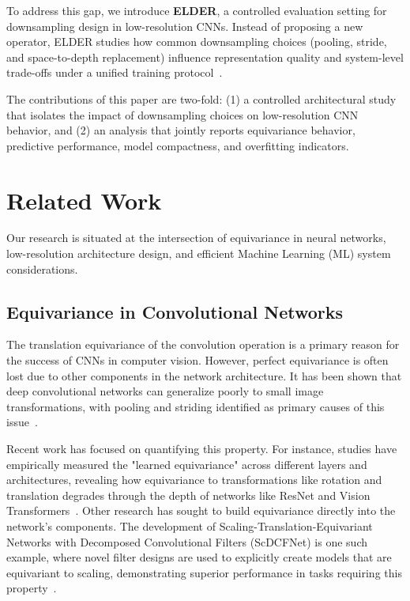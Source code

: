 \documentclass[conference]{IEEEtran}
\begin{document}
To address this gap, we introduce \textbf{ELDER}, a controlled evaluation setting for downsampling design in low-resolution CNNs. Instead of proposing a new operator, ELDER studies how common downsampling choices (pooling, stride, and space-to-depth replacement) influence representation quality and system-level trade-offs under a unified training protocol~\cite{sunkara2022}.

The contributions of this paper are two-fold: (1) a controlled architectural study that isolates the impact of downsampling choices on low-resolution CNN behavior, and (2) an analysis that jointly reports equivariance behavior, predictive performance, model compactness, and overfitting indicators.

\section{Related Work}\label{sec:related_works}

Our research is situated at the intersection of equivariance in neural networks, low-resolution architecture design, and efficient Machine Learning (ML) system considerations.

\subsection{Equivariance in Convolutional Networks}\label{subsec:equiv_in_convnets}
The translation equivariance of the convolution operation is a primary reason for the success of CNNs in computer vision. However, perfect equivariance is often lost due to other components in the network architecture. It has been shown that deep convolutional networks can generalize poorly to small image transformations, with pooling and striding identified as primary causes of this issue~\cite{azulay2019}.

Recent work has focused on quantifying this property. For instance, studies have empirically measured the "learned equivariance" across different layers and architectures, revealing how equivariance to transformations like rotation and translation degrades through the depth of networks like ResNet and Vision Transformers~\cite{bruintjes2023}. Other research has sought to build equivariance directly into the network's components. The development of Scaling-Translation-Equivariant Networks with Decomposed Convolutional Filters (ScDCFNet) is one such example, where novel filter designs are used to explicitly create models that are equivariant to scaling, demonstrating superior performance in tasks requiring this property~\cite{zhu2022}.
\end{document}
